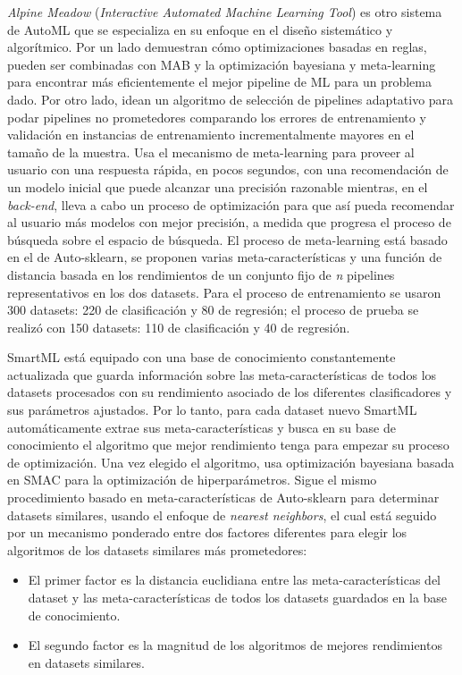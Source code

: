 \textit{Alpine Meadow} (\textit{Interactive Automated Machine Learning Tool}) \cite{shang2019democratizing} es otro sistema de AutoML que se especializa en su enfoque en el diseño sistemático y algorítmico. Por un lado demuestran cómo optimizaciones basadas en reglas, pueden ser combinadas con MAB y la optimización bayesiana y meta-learning para encontrar más eficientemente el mejor pipeline de ML para un problema dado. Por otro lado, idean un algoritmo de selección de pipelines adaptativo para podar pipelines no prometedores comparando los errores de entrenamiento y validación en instancias de entrenamiento incrementalmente mayores en el tamaño de la muestra. Usa el mecanismo de meta-learning para proveer al usuario con una respuesta rápida, en pocos segundos, con una recomendación de un modelo inicial que puede alcanzar una precisión razonable mientras, en el \textit{back-end}, lleva a cabo un proceso de optimización para que así pueda recomendar al usuario más modelos con mejor precisión, a medida que progresa el proceso de búsqueda sobre el espacio de búsqueda. El proceso de meta-learning está basado en el de Auto-sklearn, se proponen varias meta-características y una función de distancia basada en los rendimientos de un conjunto fijo de \textit{n} pipelines representativos en los dos datasets. Para el proceso de entrenamiento se usaron 300 datasets: 220 de clasificación y 80 de regresión; el proceso de prueba se realizó con 150 datasets: 110 de clasificación y 40 de regresión.

SmartML \cite{maher2019smartml} está equipado con una base de conocimiento constantemente actualizada que guarda información sobre las meta-características de todos los datasets procesados con su rendimiento asociado de los diferentes clasificadores y sus parámetros ajustados. Por lo tanto, para cada dataset nuevo SmartML automáticamente extrae sus meta-características y busca en su base de conocimiento el algoritmo que mejor rendimiento tenga para empezar su proceso de optimización. Una vez elegido el algoritmo, usa optimización bayesiana basada en SMAC para la optimización de hiperparámetros. Sigue el mismo procedimiento basado en meta-características de Auto-sklearn para determinar datasets similares, usando el enfoque de \textit{nearest neighbors}, el cual está seguido por un mecanismo ponderado entre dos factores diferentes para elegir los algoritmos de los datasets similares más prometedores:

\begin{itemize}
	\item El primer factor es la distancia euclidiana entre las meta-características del dataset y las meta-características de todos los datasets guardados en la base de conocimiento.
	\item El segundo factor es la magnitud de los algoritmos de mejores rendimientos en datasets similares.
\end{itemize}


